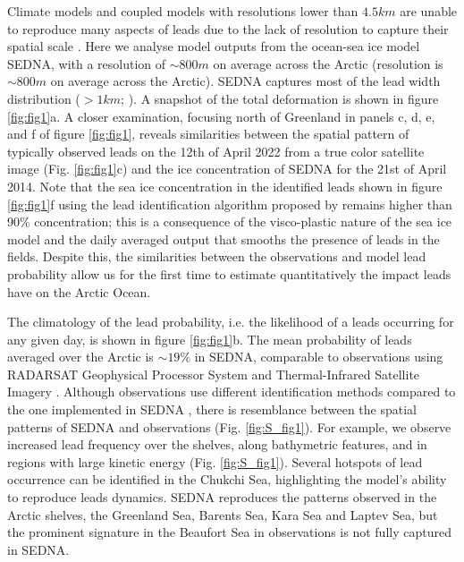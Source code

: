 \documentclass[lineno,sn-basic]{sn-jnl}%
\begin{document}
Climate models and coupled models with resolutions lower than $4.5km$ are unable to reproduce many aspects of leads due to the lack of resolution to capture their spatial scale \citep{Wang_leads_2016}. Here we analyse model outputs from the ocean-sea ice model SEDNA, with a resolution of $\sim 800m$ on average across the Arctic (resolution is $\sim 800m$ on average across the Arctic). SEDNA captures most of the lead width distribution ($>1km$; \citealt{Wernecke_Lead_2015}). 
A snapshot of the total deformation is shown in figure \ref{fig:fig1}a. A closer examination, focusing north of Greenland in panels c, d, e, and f of figure \ref{fig:fig1}, reveals similarities between the spatial pattern of typically observed leads on the 12th of April 2022 from a true color satellite image (Fig. \ref{fig:fig1}c) and the ice concentration of SEDNA for the 21st of April 2014. Note that the sea ice concentration in the identified leads shown in figure \ref{fig:fig1}f using the lead identification algorithm proposed by \citet{Hutter_identification_2019} remains higher than 90\% concentration; this is a consequence of the visco-plastic nature of the sea ice model and the daily averaged output that smooths the presence of leads in the fields. 
Despite this, the similarities between the observations and model lead probability allow us for the first time to estimate quantitatively the impact leads have on the Arctic Ocean.

The climatology of the lead probability, i.e. the likelihood of a leads occurring for any given day, is shown in figure \ref{fig:fig1}b. The mean probability of leads averaged over the Arctic is $\sim 19\%$ in SEDNA, comparable to observations using RADARSAT Geophysical Processor System and Thermal-Infrared Satellite Imagery \citep{Wernecke_Lead_2015,Willmes_leads_currents_2023}. Although observations use different identification methods compared to the one implemented in SEDNA \citep{Hutter_identification_2019}, there is resemblance between the spatial patterns of SEDNA and observations (Fig. \ref{fig:S_fig1}). For example, we observe increased lead frequency over the shelves, along bathymetric features, and in regions with large kinetic energy (Fig. \ref{fig:S_fig1}). Several hotspots of lead occurrence can be identified in the Chukchi Sea, highlighting the model's ability to reproduce leads dynamics. SEDNA reproduces the patterns observed in the Arctic shelves, the Greenland Sea, Barents Sea, Kara Sea and Laptev Sea, but the prominent signature in the Beaufort Sea in observations is not fully captured in SEDNA. 
\end{document}
